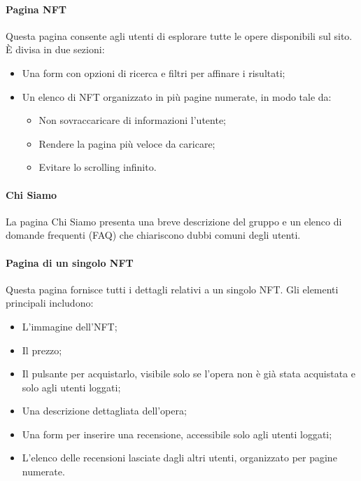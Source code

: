 \documentclass[10pt]{article}
\begin{document}
\paragraph{Pagina NFT} Questa pagina consente agli utenti di esplorare tutte le opere disponibili sul sito. È divisa in due sezioni:
\begin{itemize}
    \item Una form con opzioni di ricerca e filtri per affinare i risultati;
    \item Un elenco di NFT organizzato in più pagine numerate, in modo tale da:
    \begin{itemize}
      \item Non sovraccaricare di informazioni l'utente;
      \item Rendere la pagina più veloce da caricare;
      \item Evitare lo scrolling infinito.
    \end{itemize}
\end{itemize}

\paragraph{Chi Siamo} La pagina Chi Siamo presenta una breve descrizione del gruppo e un elenco di domande frequenti (FAQ) che chiariscono dubbi comuni degli utenti.

\paragraph{Pagina di un singolo NFT} Questa pagina fornisce tutti i dettagli relativi a un singolo NFT. Gli elementi principali includono:
\begin{itemize}
    \item L’immagine dell’NFT;
    \item Il prezzo;
    \item Il pulsante per acquistarlo, visibile solo se l'opera non è già stata acquistata e solo agli utenti loggati;
    \item Una descrizione dettagliata dell’opera;
    \item Una form per inserire una recensione, accessibile solo agli utenti loggati;
    \item L’elenco delle recensioni lasciate dagli altri utenti, organizzato per pagine numerate.
\end{itemize}
\end{document}
